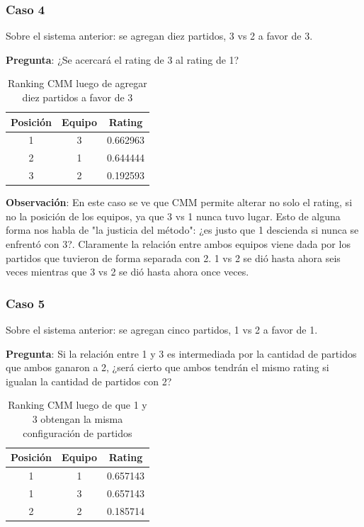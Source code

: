\newpage

\subsubsection*{Caso 4}

Sobre el sistema anterior: se agregan diez partidos, 3 vs 2 a favor de 3.

\textbf{Pregunta}: ¿Se acercará el rating de 3 al rating de 1?

\begin{table}[h!]
    \begin{center}
        \begin{tabular}{|c|c|c|}
        \hline
        \textbf{Posición} & \textbf{Equipo} & \textbf{Rating} \\
        \hline
        1 & 3 & 0.662963\\
        2 & 1 & 0.644444\\
        3 & 2 & 0.192593\\
        \hline
        \end{tabular}
        \caption{Ranking CMM luego de agregar diez partidos a favor de 3}
        \label{cmm_caso_4}
    \end{center}
\end{table}

\textbf{Observación}: En este caso se ve que CMM permite alterar no solo el rating, si no la posición de los equipos, ya que 3 vs 1 nunca tuvo lugar. Esto de alguna forma nos habla de "la justicia del método": ¿es justo que 1 descienda si nunca se enfrentó con 3?. Claramente la relación entre ambos equipos viene dada por los partidos que tuvieron de forma separada con 2. 1 vs 2 se dió hasta ahora seis veces mientras que 3 vs 2 se dió hasta ahora once veces.

\subsubsection*{Caso 5}

Sobre el sistema anterior: se agregan cinco partidos, 1 vs 2 a favor de 1.

\textbf{Pregunta}: Si la relación entre 1 y 3 es intermediada por la cantidad de partidos que ambos ganaron a 2, ¿será cierto que ambos tendrán el mismo rating si igualan la cantidad de partidos con 2?

\begin{table}[h!]
    \begin{center}
        \begin{tabular}{|c|c|c|}
        \hline
        \textbf{Posición} & \textbf{Equipo} & \textbf{Rating} \\
        \hline
        1 & 1 & 0.657143\\
        1 & 3 & 0.657143\\
        2 & 2 & 0.185714\\
        \hline
        \end{tabular}
        \caption{Ranking CMM luego de que 1 y 3 obtengan la misma configuración de partidos}
        \label{cmm_caso_5}
    \end{center}
\end{table}

